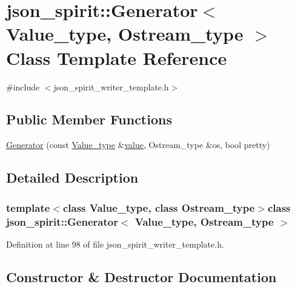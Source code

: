 \hypertarget{classjson__spirit_1_1_generator}{}\section{json\+\_\+spirit\+:\+:Generator$<$ Value\+\_\+type, Ostream\+\_\+type $>$ Class Template Reference}
\label{classjson__spirit_1_1_generator}


{\ttfamily \#include $<$json\+\_\+spirit\+\_\+writer\+\_\+template.\+h$>$}

\subsection*{Public Member Functions}
\begin{DoxyCompactItemize}
\item 
\hyperlink{classjson__spirit_1_1_generator_a867f4fc0ee9faa2d470e0ab21d4103f4}{Generator} (const \hyperlink{namespacejson__spirit_aeaad57c912e0370a76f60cd510ad3d74}{Value\+\_\+type} \&\hyperlink{cache_8cc_a0f61d63b009d0880a89c843bd50d8d76}{value}, Ostream\+\_\+type \&os, bool pretty)
\end{DoxyCompactItemize}


\subsection{Detailed Description}
\subsubsection*{template$<$class Value\+\_\+type, class Ostream\+\_\+type$>$class json\+\_\+spirit\+::\+Generator$<$ Value\+\_\+type, Ostream\+\_\+type $>$}



Definition at line 98 of file json\+\_\+spirit\+\_\+writer\+\_\+template.\+h.



\subsection{Constructor \& Destructor Documentation}
\hypertarget{classjson__spirit_1_1_generator_a867f4fc0ee9faa2d470e0ab21d4103f4}{}
